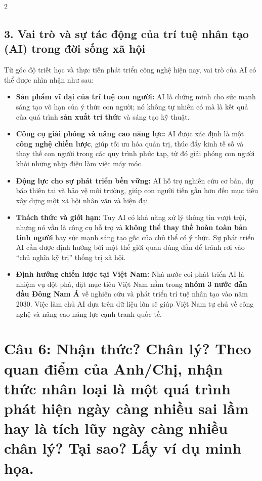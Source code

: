 \documentclass[9pt,a4paper]{extarticle}
\begin{document}
\begin{multicols*}{2}
\subsection*{3. Vai trò và sự tác động của trí tuệ nhân tạo (AI) trong đời sống xã hội}

Từ góc độ triết học và thực tiễn phát triển công nghệ hiện nay, vai trò của AI có thể được nhìn nhận như sau:

\begin{itemize}
\item \textbf{Sản phẩm vĩ đại của trí tuệ con người:} AI là chứng minh cho sức mạnh sáng tạo vô hạn của ý thức con người; nó không tự nhiên có mà là kết quả của quá trình \textbf{sản xuất tri thức} và sáng tạo kỹ thuật.
\item \textbf{Công cụ giải phóng và nâng cao năng lực:} AI được xác định là một \textbf{công nghệ chiến lược}, giúp tối ưu hóa quản trị, thúc đẩy kinh tế số và thay thế con người trong các quy trình phức tạp, từ đó giải phóng con người khỏi những nhịp điệu làm việc máy móc.
\item \textbf{Động lực cho sự phát triển bền vững:} AI hỗ trợ nghiên cứu cơ bản, dự báo thiên tai và bảo vệ môi trường, giúp con người tiến gần hơn đến mục tiêu xây dựng một xã hội nhân văn và hiện đại.
\item \textbf{Thách thức và giới hạn:} Tuy AI có khả năng xử lý thông tin vượt trội, nhưng nó vẫn là công cụ hỗ trợ và \textbf{không thể thay thế hoàn toàn bản tính người} hay sức mạnh sáng tạo gốc của chủ thể có ý thức. Sự phát triển AI cần được định hướng bởi một thế giới quan đúng đắn để tránh rơi vào ``chủ nghĩa kỹ trị'' thống trị xã hội.
\item \textbf{Định hướng chiến lược tại Việt Nam:} Nhà nước coi phát triển AI là nhiệm vụ đột phá, đặt mục tiêu Việt Nam nằm trong \textbf{nhóm 3 nước dẫn đầu Đông Nam Á} về nghiên cứu và phát triển trí tuệ nhân tạo vào năm 2030. Việc làm chủ AI dựa trên dữ liệu lớn sẽ giúp Việt Nam tự chủ về công nghệ và nâng cao năng lực cạnh tranh quốc tế.
\end{itemize}

\section*{Câu 6: Nhận thức? Chân lý? Theo quan điểm của Anh/Chị, nhận thức nhân loại là một quá trình phát hiện ngày càng nhiều sai lầm hay là tích lũy ngày càng nhiều chân lý? Tại sao? Lấy ví dụ minh họa.}


\end{multicols*}
\end{document}
